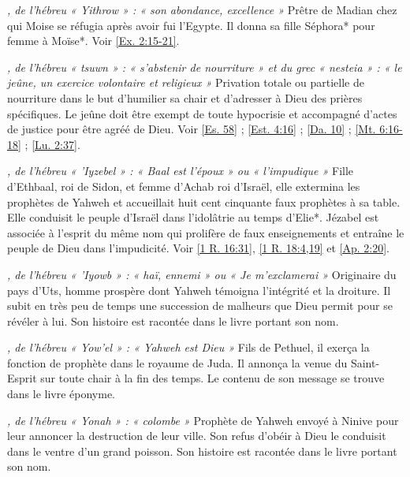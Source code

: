 \begin{multicols}{2}
\textit{, de l'hébreu « Yithrow » : « son abondance, excellence »}\newline
Prêtre de Madian chez qui Moise se réfugia après avoir fui l'Egypte. Il donna sa fille Séphora* pour femme à Moïse*. Voir \vref{Ex. 2:15-21}.

\textit{, de l'hébreu « tsuwn » : « s'abstenir de nourriture » et du grec « nesteia » : « le jeûne, un exercice volontaire et religieux »}\newline
Privation totale ou partielle de nourriture dans le but d'humilier sa chair et d'adresser à Dieu des prières spécifiques. Le jeûne doit être exempt de toute hypocrisie et accompagné d'actes de justice pour être agréé de Dieu. Voir \vref{Es. 58} ; \vref{Est. 4:16} ; \vref{Da. 10} ; \vref{Mt. 6:16-18} ; \vref{Lu. 2:37}.

\textit{, de l'hébreu « 'Iyzebel » : « Baal est l'époux » ou « l'impudique »}\newline
Fille d'Ethbaal, roi de Sidon, et femme d'Achab roi d'Israël, elle extermina les prophètes de Yahweh et accueillait huit cent cinquante faux prophètes à sa table. Elle conduisit le peuple d'Israël dans l'idolâtrie au temps d'Elie*. Jézabel est associée à l'esprit du même nom qui prolifère de faux enseignements et entraîne le peuple de Dieu dans l'impudicité. Voir \vref{1 R. 16:31}, \vref{1 R. 18:4,19} et \vref{Ap. 2:20}.

\textit{, de l'hébreu « 'Iyowb » : « haï, ennemi » ou « Je m'exclamerai »}\newline
Originaire du pays d'Uts, homme prospère dont Yahweh témoigna l'intégrité et la droiture. Il subit en très peu de temps une succession de malheurs que Dieu permit pour se révéler à lui. Son histoire est racontée dans le livre portant son nom.

\textit{, de l'hébreu « Yow'el » : « Yahweh est Dieu »}\newline
Fils de Pethuel, il exerça la fonction de prophète dans le royaume de Juda. Il annonça la venue du Saint-Esprit sur toute chair à la fin des temps. Le contenu de son message se trouve dans le livre éponyme.

\textit{, de l'hébreu « Yonah » : « colombe »}\newline
Prophète de Yahweh envoyé à Ninive pour leur annoncer la destruction de leur ville. Son refus d'obéir à Dieu le conduisit dans le ventre d'un grand poisson. Son histoire est racontée dans le livre portant son nom.


\end{multicols}
